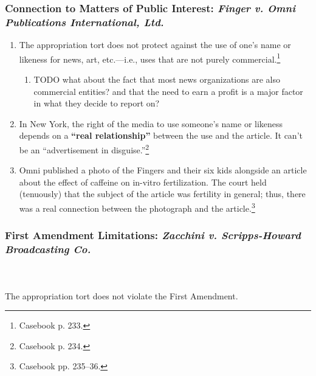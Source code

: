 \subsubsection{Connection to Matters of Public Interest: \emph{Finger v. Omni 
Publications International, Ltd.}}

\begin{enumerate}
    \item The appropriation tort does not protect against the use of one's name 
    or likeness for news, art, etc.---i.e., uses that are not purely 
    commercial.\footnote{Casebook p. 233.}
    \begin{enumerate}
        \item TODO what about the fact that most news organizations are also 
        commercial entities? and that the need to earn a profit is a major 
        factor in what they decide to report on?
    \end{enumerate}
    \item In New York, the right of the media to use someone's name or likeness 
    depends on a \textbf{``real relationship''} between the use and the article.  
    It can't be an ``advertisement in disguise.''\footnote{Casebook p. 234.}
    \item Omni published a photo of the Fingers and their six kids alongside an 
    article about the effect of caffeine on in-vitro fertilization. The court 
    held (tenuously) that the subject of the article was fertility in general; 
    thus, there was a real connection between the photograph and the 
    article.\footnote{Casebook pp. 235--36.}
\end{enumerate}

\subsubsection{First Amendment Limitations: \emph{Zacchini v. Scripps-Howard 
Broadcasting Co.}}
~\\\\
The appropriation tort does not violate the First Amendment.

